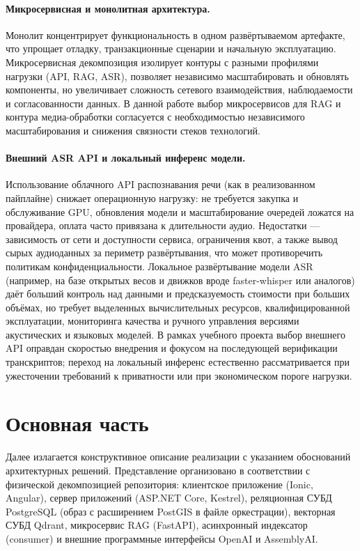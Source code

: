 \documentclass{article}
\begin{document}
\paragraph{Микросервисная и монолитная архитектура.}
Монолит концентрирует функциональность в одном развёртываемом артефакте, что упрощает отладку, транзакционные сценарии и начальную эксплуатацию. Микросервисная декомпозиция изолирует контуры с разными профилями нагрузки (API, RAG, ASR), позволяет независимо масштабировать и обновлять компоненты, но увеличивает сложность сетевого взаимодействия, наблюдаемости и согласованности данных. В данной работе выбор микросервисов для RAG и контура медиа-обработки согласуется с необходимостью независимого масштабирования и снижения связности стеков технологий.

\paragraph{Внешний ASR API и локальный инференс модели.}
Использование облачного API распознавания речи (как в реализованном пайплайне) снижает операционную нагрузку: не требуется закупка и обслуживание GPU, обновления модели и масштабирование очередей ложатся на провайдера, оплата часто привязана к длительности аудио. Недостатки --- зависимость от сети и доступности сервиса, ограничения квот, а также вывод сырых аудиоданных за периметр развёртывания, что может противоречить политикам конфиденциальности. Локальное развёртывание модели ASR (например, на базе открытых весов и движков вроде faster-whisper или аналогов) даёт больший контроль над данными и предсказуемость стоимости при больших объёмах, но требует выделенных вычислительных ресурсов, квалифицированной эксплуатации, мониторинга качества и ручного управления версиями акустических и языковых моделей. В рамках учебного проекта выбор внешнего API оправдан скоростью внедрения и фокусом на последующей верификации транскриптов; переход на локальный инференс естественно рассматривается при ужесточении требований к приватности или при экономическом пороге нагрузки.

\section{Основная часть}

Далее излагается конструктивное описание реализации с указанием обоснований архитектурных решений. Представление организовано в соответствии с физической декомпозицией репозитория: клиентское приложение (Ionic, Angular), сервер приложений (ASP.NET Core, Kestrel), реляционная СУБД PostgreSQL (образ с расширением PostGIS в файле оркестрации), векторная СУБД Qdrant, микросервис RAG (FastAPI), асинхронный индексатор (consumer) и внешние программные интерфейсы OpenAI и AssemblyAI.
\end{document}
